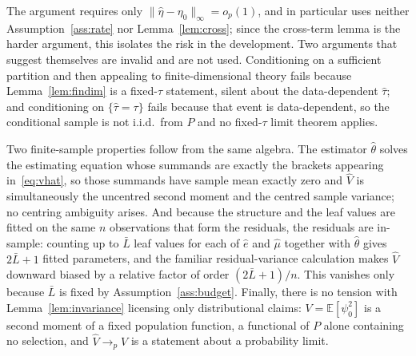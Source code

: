 \documentclass[11pt]{article}
\theoremstyle{plain}
\theoremstyle{definition}
\theoremstyle{remark}
\newcommand{\E}{\mathbb{E}}
\newcommand{\ehat}{\widehat{e}}
\newcommand{\mhat}{\widehat{\mu}}
\newcommand{\that}{\widehat{\tau}}
\newcommand{\thetahat}{\widehat{\theta}}
\newcommand{\Vhat}{\widehat{V}}
\newcommand{\Linf}[1]{\lVert #1 \rVert_{\infty}}
\begin{document}
\noindent The argument requires only $\Linf{\widehat\eta-\eta_0}=o_p(1)$, and in
particular uses neither Assumption~\ref{ass:rate} nor Lemma~\ref{lem:cross};
since the cross-term lemma is the harder argument, this isolates the risk in the
development. Two arguments that suggest themselves are invalid and are not used.
Conditioning on a sufficient partition and then appealing to finite-dimensional
theory fails because Lemma~\ref{lem:findim} is a fixed-$\tau$ statement, silent
about the data-dependent $\that$; and conditioning on $\{\that=\tau\}$ fails
because that event is data-dependent, so the conditional sample is not i.i.d.\
from $P$ and no fixed-$\tau$ limit theorem applies.

Two finite-sample properties follow from the same algebra. The estimator
$\thetahat$ solves the estimating equation whose summands are exactly the
brackets appearing in~\eqref{eq:vhat}, so those summands have sample mean exactly
zero and $\Vhat$ is simultaneously the uncentred second moment and the centred
sample variance; no centring ambiguity arises. And because the structure and the
leaf values are fitted on the same $n$ observations that form the residuals, the
residuals are in-sample: counting up to $\bar L$ leaf values for each of $\ehat$
and $\mhat$ together with $\thetahat$ gives $2\bar L+1$ fitted parameters, and
the familiar residual-variance calculation makes $\Vhat$ downward biased by a
relative factor of order $(2\bar L+1)/n$. This vanishes only because $\bar L$ is
fixed by Assumption~\ref{ass:budget}. Finally, there is no tension with
Lemma~\ref{lem:invariance} licensing only distributional claims:
$V=\E[\psi_0^2]$ is a second moment of a fixed population function, a functional
of $P$ alone containing no selection, and $\Vhat\to_pV$ is a statement about a
probability limit.
\end{document}
